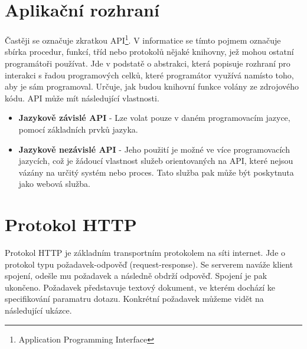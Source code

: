 

\section{Aplikační rozhraní}

Častěji se označuje zkratkou API\footnote{Application Programming Interface}.
V informatice se tímto pojmem označuje sbírka procedur, funkcí, tříd
nebo protokolů nějaké knihovny, jež mohou ostatní programátoři používat.
Jde v podstatě o abstrakci, která popisuje rozhraní pro interakci s řadou programových celků,
které programátor využívá namísto toho, aby je sám programoval.
Určuje, jak budou knihovní funkce volány ze zdrojového kódu. API může mít následující vlastnosti.

\begin{itemize}
  \item \textbf{Jazykově závislé API} - Lze volat pouze v daném programovacím jazyce, pomocí základních prvků jazyka.
  \item \textbf{Jazykově nezávislé API} - Jeho použití je možné ve více programovacích jazycích, což je žádoucí vlastnost
    služeb orientovaných na API, které nejsou vázány na určitý systém nebo proces.
    Tato služba pak může být poskytnuta jako webová služba.
\end{itemize}

\section{Protokol HTTP}


Protokol HTTP je základním transportním protokolem na síti internet.
Jde o protokol typu požadavek-odpověď (request-response). Se serverem naváže klient spojení,
odešle mu požadavek a následně obdrží odpověď. Spojení je pak ukončeno.
Požadavek představuje textový dokument, ve kterém dochází ke specifikování paramatru dotazu.
Konkrétní požadavek můžeme vidět na následující ukázce.

